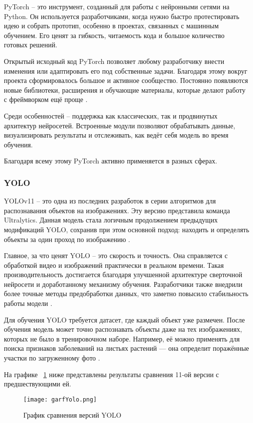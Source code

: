 PyTorch -- это инструмент, созданный для работы с нейронными сетями на Python. Он используется разработчиками, когда нужно быстро протестировать идею и собрать прототип, особенно в проектах, связанных с машинным обучением. Его ценят за гибкость, читаемость кода и большое количество готовых решений.

Открытый исходный код PyTorch позволяет любому разработчику внести изменения или адаптировать его под собственные задачи. Благодаря этому вокруг проекта сформировалось большое и активное сообщество. Постоянно появляются новые библиотеки, расширения и обучающие материалы, которые делают работу с фреймворком ещё проще \cite{yolo6}.

Среди особенностей -- поддержка как классических, так и продвинутых архитектур нейросетей. Встроенные модули позволяют обрабатывать данные, визуализировать результаты и отслеживать, как ведёт себя модель во время обучения.

Благодаря всему этому PyTorch активно применяется в разных сферах.

\subsubsection{YOLO}

YOLOv11 -- это одна из последних разработок в серии алгоритмов для распознавания объектов на изображениях. Эту версию представила команда Ultralytics. Данная модель стала логичным продолжением предыдущих модификаций YOLO, сохранив при этом основной подход: находить и определять объекты за один проход по изображению \cite{yolo8}.

Главное, за что ценят YOLO -- это скорость и точность. Она справляется с обработкой видео и изображений практически в реальном времени. Такая производительность достигается благодаря улучшенной архитектуре сверточной нейросети и доработанному механизму обучения. Разработчики также внедрили более точные методы предобработки данных, что заметно повысило стабильность работы модели \cite{yolo2}. 

Для обучения YOLO требуется датасет, где каждый объект уже размечен. После обучения модель может точно распознавать объекты даже на тех изображениях, которых не было в тренировочном наборе. Например, её можно применять для поиска признаков заболеваний на листьях растений — она определит поражённые участки по загруженному фото \cite{yolo1}.

На графике ~\ref{graf:image} ниже представлены результаты сравнения 11-ой версии с предшествующими ей. 
\begin{figure}[H]
	\centering
	\texttt{[image: garfYolo.png]}
	\caption{График сравнения версий YOLO}
	\label{graf:image}
\end{figure}

